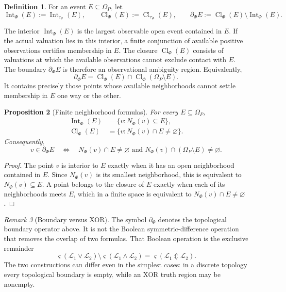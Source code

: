 \documentclass[11pt]{article}
\theoremstyle{definition}
\newtheorem{definition}{Definition}[section]
\theoremstyle{plain}
\newtheorem{proposition}[definition]{Proposition}
\theoremstyle{remark}
\newtheorem{remark}[definition]{Remark}
\newcommand{\Int}{\operatorname{Int}}
\newcommand{\Cl}{\operatorname{Cl}}
\newcommand{\bd}{\partial}
\begin{document}
\begin{definition}
For an event $E\subseteq\Omega_P$, let
\[
 \Int_\Phi(E):=\Int_{\tau_\Phi}(E),\qquad
 \Cl_\Phi(E):=\Cl_{\tau_\Phi}(E),\qquad
 \bd_\Phi E:=\Cl_\Phi(E)\setminus\Int_\Phi(E).
\]
\end{definition}

The interior $\Int_\Phi(E)$ is the largest observable open event contained in
$E$.  If the actual valuation lies in this interior, a finite conjunction of
available positive observations certifies membership in $E$.  The closure $\Cl_\Phi(E)$ consists of
valuations at which the available observations cannot exclude contact with
$E$.  The boundary $\bd_\Phi E$ is therefore an observational ambiguity region.
Equivalently,
\[
 \bd_\Phi E
 =\Cl_\Phi(E)\cap\Cl_\Phi(\Omega_P\setminus E).
\]
It contains precisely those points whose available neighborhoods cannot settle
membership in $E$ one way or the other.

\begin{proposition}[Finite neighborhood formulas]
For every $E\subseteq\Omega_P$,
\begin{align*}
 \Int_\Phi(E)&=\{v:N_\Phi(v)\subseteq E\},\\
 \Cl_\Phi(E)&=\{v:N_\Phi(v)\cap E\neq\varnothing\}.
\end{align*}
Consequently,
\[
 v\in\bd_\Phi E
 \quad\Longleftrightarrow\quad
 N_\Phi(v)\cap E\neq\varnothing
 \text{ and }
 N_\Phi(v)\cap(\Omega_P\setminus E)\neq\varnothing.
\]
\end{proposition}

\begin{proof}
The point $v$ is interior to $E$ exactly when it has an open neighborhood
contained in $E$.  Since $N_\Phi(v)$ is its smallest neighborhood, this is
equivalent to $N_\Phi(v)\subseteq E$.  A point belongs to the closure of $E$
exactly when each of its neighborhoods meets $E$, which in a finite space is
equivalent to $N_\Phi(v)\cap E\neq\varnothing$.
\end{proof}

\begin{remark}[Boundary versus XOR]
The symbol $\bd_\Phi$ denotes the topological boundary operator above.  It is
not the Boolean symmetric-difference operation that removes the overlap of two
formulas.  That Boolean operation is the exclusive remainder
\[
 \varsigma(\mathcal L_1\vee\mathcal L_2)
 \setminus\varsigma(\mathcal L_1\wedge\mathcal L_2)
 =\varsigma(\mathcal L_1\Updownarrow\mathcal L_2).
\]
The two constructions can differ even in the simplest cases: in a discrete
topology every topological boundary is empty, while an XOR truth region
may be nonempty.
\end{remark}
\end{document}
